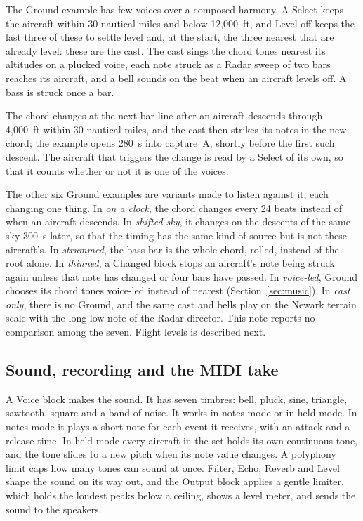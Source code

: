 \documentclass[11pt,letterpaper]{article}
\begin{document}
The Ground example has few voices over a composed harmony. A Select keeps the aircraft within 30 nautical miles and below 12,000~ft, and Level-off keeps the last three of these to settle level and, at the start, the three nearest that are already level: these are the cast. The cast sings the chord tones nearest its altitudes on a plucked voice, each note struck as a Radar sweep of two bars reaches its aircraft, and a bell sounds on the beat when an aircraft levels off. A bass is struck once a bar.

The chord changes at the next bar line after an aircraft descends through 4,000~ft within 30 nautical miles, and the cast then strikes its notes in the new chord; the example opens 280~s into capture~A, shortly before the first such descent. The aircraft that triggers the change is read by a Select of its own, so that it counts whether or not it is one of the voices.

The other six Ground examples are variants made to listen against it, each changing one thing. In \emph{on a clock}, the chord changes every 24 beats instead of when an aircraft descends. In \emph{shifted sky}, it changes on the descents of the same sky 300~s later, so that the timing has the same kind of source but is not these aircraft's. In \emph{strummed}, the bass bar is the whole chord, rolled, instead of the root alone. In \emph{thinned}, a Changed block stops an aircraft's note being struck again unless that note has changed or four bars have passed. In \emph{voice-led}, Ground chooses its chord tones voice-led instead of nearest (Section~\ref{sec:music}). In \emph{cast only}, there is no Ground, and the same cast and bells play on the Newark terrain scale with the long low note of the Radar director. This note reports no comparison among the seven. Flight levels is described next.

\subsection{Sound, recording and the MIDI take}

A Voice block makes the sound. It has seven timbres: bell, pluck, sine, triangle, sawtooth, square and a band of noise. It works in notes mode or in held mode. In notes mode it plays a short note for each event it receives, with an attack and a release time. In held mode every aircraft in the set holds its own continuous tone, and the tone slides to a new pitch when its note value changes. A polyphony limit caps how many tones can sound at once. Filter, Echo, Reverb and Level shape the sound on its way out, and the Output block applies a gentle limiter, which holds the loudest peaks below a ceiling, shows a level meter, and sends the sound to the speakers.
\end{document}
